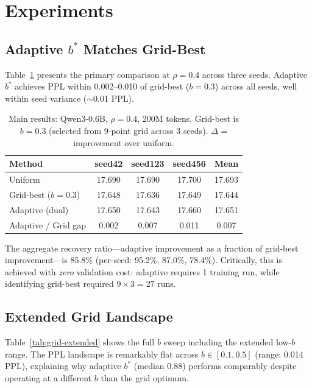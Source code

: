 \documentclass[11pt,a4paper]{article}
\newcommand{\bstar}{b^{*}}
\begin{document}
\section{Experiments}
\label{sec:experiments}

\subsection{Adaptive $\bstar$ Matches Grid-Best}
\label{sec:main-results}

Table~\ref{tab:main} presents the primary comparison at $\rho=0.4$ across three seeds.
Adaptive $\bstar$ achieves PPL within 0.002--0.010 of grid-best ($b=0.3$) across all seeds, well within seed variance ($\sim$0.01 PPL).

\begin{table}[t]
\centering
\small
\caption{Main results: Qwen3-0.6B, $\rho=0.4$, 200M tokens. Grid-best is $b=0.3$ (selected from 9-point grid across 3 seeds). $\Delta$ = improvement over uniform.}
\label{tab:main}
\begin{tabular}{lcccc}
\toprule
\textbf{Method} & \textbf{seed42} & \textbf{seed123} & \textbf{seed456} & \textbf{Mean} \\
\midrule
Uniform & 17.690 & 17.690 & 17.700 & 17.693 \\
Grid-best ($b\!=\!0.3$) & 17.648 & 17.636 & 17.649 & 17.644 \\
Adaptive (dual) & 17.650 & 17.643 & 17.660 & 17.651 \\
\midrule
Adaptive / Grid gap & 0.002 & 0.007 & 0.011 & 0.007 \\
\bottomrule
\end{tabular}
\end{table}

The aggregate recovery ratio---adaptive improvement as a fraction of grid-best improvement---is 85.8\% (per-seed: 95.2\%, 87.0\%, 78.4\%).
Critically, this is achieved with \emph{zero} validation cost: adaptive requires 1 training run, while identifying grid-best required $9\times 3 = 27$ runs.

\subsection{Extended Grid Landscape}
\label{sec:grid-landscape}

Table~\ref{tab:grid-extended} shows the full $b$ sweep including the extended low-$b$ range.
The PPL landscape is remarkably flat across $b\in[0.1, 0.5]$ (range: 0.014 PPL), explaining why adaptive $\bstar$ (median 0.88) performs comparably despite operating at a different $b$ than the grid optimum.
\end{document}

